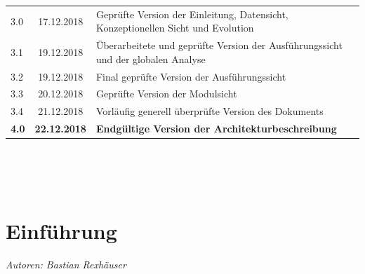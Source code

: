 \documentclass[enabledeprecatedfontcommands,fontsize=11pt,paper=a4,twoside]{scrartcl}
\newcounter{one}
\begin{document}
\begin{tabular}{p{}cp{12cm}}
		3.0 & 17.12.2018 & Geprüfte Version der Einleitung, Datensicht, Konzeptionellen Sicht und Evolution\\
		3.1 & 19.12.2018 & Überarbeitete und geprüfte Version der Ausführungssicht und der globalen Analyse\\
		3.2 & 19.12.2018 & Final geprüfte Version der Ausführungssicht \\
		3.3 & 20.12.2018 & Geprüfte Version der Modulsicht \\
		3.4 & 21.12.2018 & Vorläufig generell überprüfte Version des Dokuments \\
		\textbf{4.0} & \textbf{22.12.2018} & \textbf{Endgültige Version der Architekturbeschreibung} \\
		
		
	\end{tabular}
	\\ \\ \\ \newpage
	
	\thispagestyle{empty}
	\cleardoublepage
	
	
	\newpage
	\section{Einführung}
	\label{sec:intro}
	\emph{Autoren: Bastian Rexhäuser}
\end{document}
